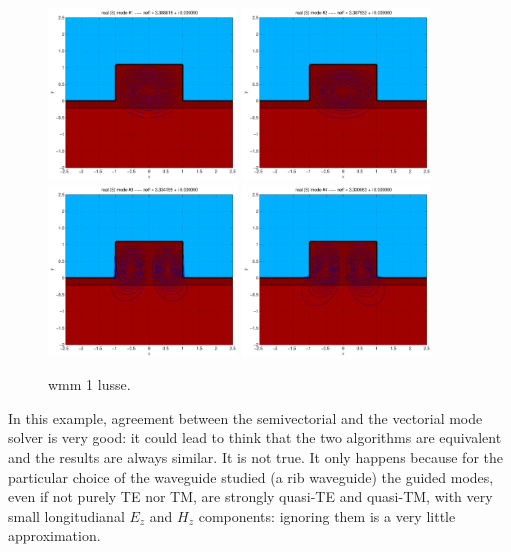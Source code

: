 \begin{figure}[htbp]
  \begin{center}
    \includegraphics[width=5cm]{pics/wmm01_lusse_1}
    \includegraphics[width=5cm]{pics/wmm01_lusse_2}
    \includegraphics[width=5cm]{pics/wmm01_lusse_3}
    \includegraphics[width=5cm]{pics/wmm01_lusse_4}
  \end{center}
  \caption{wmm 1 lusse.}
  \label{fig:wmm1_lusse}
\end{figure}  

In this example, agreement between the semivectorial and the vectorial
mode solver is very good: it could lead to think that the two
algorithms are equivalent and the results are always similar. It is
not true. It only happens because for the particular choice of the
waveguide studied (a rib waveguide) the guided modes, even if not
purely TE nor TM, are strongly quasi-TE and quasi-TM, with very
small longitudianal $E_z$ and $H_z$ components: ignoring them is a
very little approximation.

